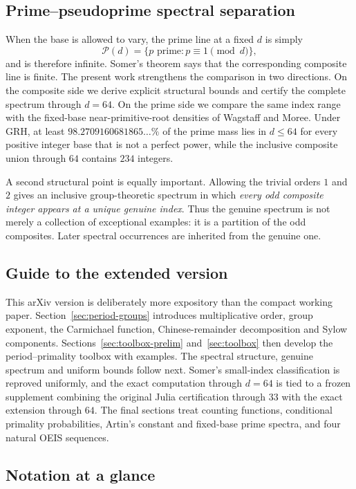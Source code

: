 \documentclass[11pt]{article}
\begin{document}
\subsection*{Prime--pseudoprime spectral separation}

When the base is allowed to vary, the prime line at a fixed $d$ is simply
\[
\mathcal P(d)=\{p\text{ prime}:p\equiv1\pmod d\},
\]
and is therefore infinite.  Somer's theorem says that the corresponding
composite line is finite.  The present work strengthens the comparison in two
directions.  On the composite side we derive explicit structural bounds and
certify the complete spectrum through $d=64$.  On the prime side we compare
the same index range with the fixed-base near-primitive-root densities of
Wagstaff and Moree.  Under GRH, at least
$98.2709160681865\ldots\%$ of the prime mass lies in $d\le64$ for every
positive integer base that is not a perfect power, while the inclusive
composite union through $64$ contains $234$ integers.

A second structural point is equally important.  Allowing the trivial orders
$1$ and $2$ gives an inclusive group-theoretic spectrum in which \emph{every
odd composite integer appears at a unique genuine index}.  Thus the genuine
spectrum is not merely a collection of exceptional examples: it is a
partition of the odd composites.  Later spectral occurrences are inherited
from the genuine one.

\subsection*{Guide to the extended version}

This arXiv version is deliberately more expository than the compact working
paper.  Section~\ref{sec:period-groups} introduces multiplicative order,
group exponent, the Carmichael function, Chinese-remainder decomposition and
Sylow components.  Sections~\ref{sec:toolbox-prelim} and~\ref{sec:toolbox}
then develop the period--primality toolbox with examples.  The spectral
structure, genuine spectrum and uniform bounds follow next.  Somer's
small-index classification is reproved uniformly, and the exact computation through $d=64$ is tied to a frozen supplement combining the original Julia certification through $33$ with the exact extension through $64$.
The final sections treat counting functions, conditional primality
probabilities, Artin's constant and fixed-base prime spectra, and four natural
OEIS sequences.

\subsection*{Notation at a glance}
\end{document}
